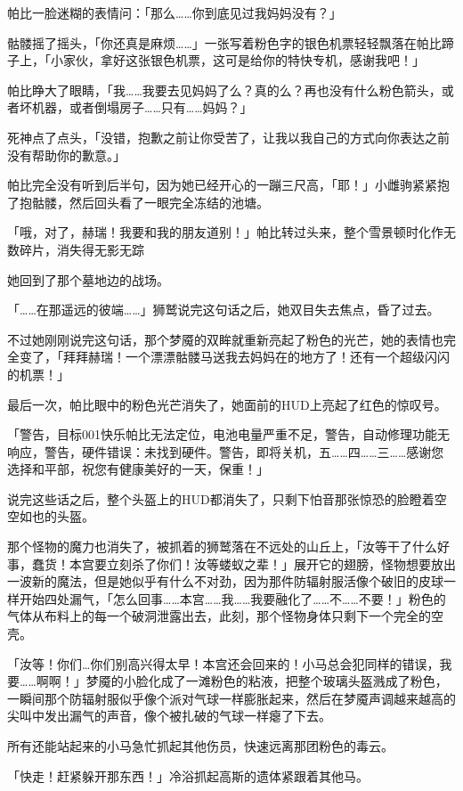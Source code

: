 帕比一脸迷糊的表情问：「那么……你到底见过我妈妈没有？」

骷髅摇了摇头，「你还真是麻烦……」一张写着粉色字的银色机票轻轻飘落在帕比蹄子上，「小家伙，拿好这张银色机票，这可是给你的特快专机，感谢我吧！」

帕比睁大了眼睛，「我……我要去见妈妈了么？真的么？再也没有什么粉色箭头，或者坏机器，或者倒塌房子……只有……妈妈？」

死神点了点头，「没错，抱歉之前让你受苦了，让我以我自己的方式向你表达之前没有帮助你的歉意。」

帕比完全没有听到后半句，因为她已经开心的一蹦三尺高，「耶！」小雌驹紧紧抱了抱骷髅，然后回头看了一眼完全冻结的池塘。

「哦，对了，赫瑞！我要和我的朋友道别！」帕比转过头来，整个雪景顿时化作无数碎片，消失得无影无踪

她回到了那个墓地边的战场。

\horizonline

「……在那遥远的彼端……」狮鹫说完这句话之后，她双目失去焦点，昏了过去。

不过她刚刚说完这句话，那个梦魇的双眸就重新亮起了粉色的光芒，她的表情也完全变了，「拜拜赫瑞！一个漂漂骷髅马送我去妈妈在的地方了！还有一个超级闪闪的机票！」

最后一次，帕比眼中的粉色光芒消失了，她面前的HUD上亮起了红色的惊叹号。

「{\mt 警告，目标001快乐帕比无法定位，电池电量严重不足，警告，自动修理功能无响应，警告，硬件错误：未找到硬件。警告，即将关机，五……四……三……感谢您选择和平部，祝您有健康美好的一天，保重！}」

说完这些话之后，整个头盔上的HUD都消失了，只剩下怕音那张惊恐的脸瞪着空空如也的头盔。

那个怪物的魔力也消失了，被抓着的狮鹫落在不远处的山丘上，「汝等干了什么好事，蠢货！本宫要立刻杀了你们！汝等蝼蚁之辈！」展开它的翅膀，怪物想要放出一波新的魔法，但是她似乎有什么不对劲，因为那件防辐射服活像个破旧的皮球一样开始四处漏气，「怎么回事……本宫……我……我要融化了……不……不要！」粉色的气体从布料上的每一个破洞泄露出去，此刻，那个怪物身体只剩下一个完全的空壳。

「汝等！你们\ldots 你们别高兴得太早！本宫还会回来的！小马总会犯同样的错误，我要……啊啊！」梦魇的小脸化成了一滩粉色的粘液，把整个玻璃头盔溅成了粉色，一瞬间那个防辐射服似乎像个派对气球一样膨胀起来，然后在梦魇声调越来越高的尖叫中发出漏气的声音，像个被扎破的气球一样瘪了下去。

所有还能站起来的小马急忙抓起其他伤员，快速远离那团粉色的毒云。

「快走！赶紧躲开那东西！」冷浴抓起高斯的遗体紧跟着其他马。

